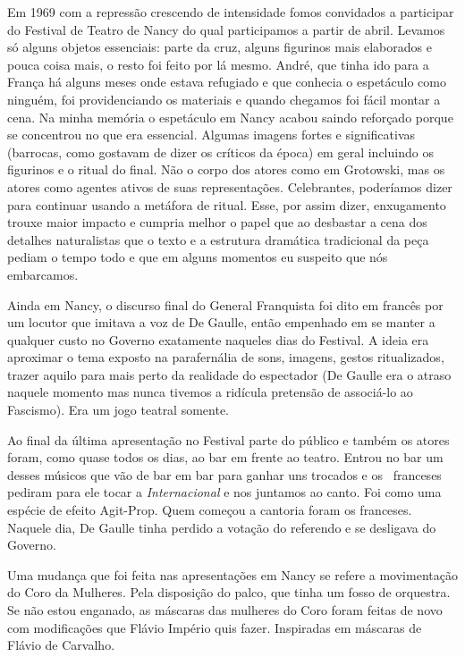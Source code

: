 Em 1969 com a repressão crescendo de intensidade fomos convidados a
participar do Festival de Teatro de Nancy do qual participamos a partir
de abril. Levamos só alguns objetos essenciais: parte da cruz, alguns
figurinos mais elaborados e pouca coisa mais, o resto foi feito por lá
mesmo. André, que tinha ido para a França há alguns meses onde estava
refugiado e que conhecia o espetáculo como ninguém, foi providenciando
os materiais e quando chegamos foi fácil montar a cena. Na minha memória
o espetáculo em Nancy acabou saindo reforçado porque se concentrou no
que era essencial. Algumas imagens fortes e significativas (barrocas,
como gostavam de dizer os críticos da época) em geral incluindo os
figurinos e o ritual do final. Não o corpo dos atores como em Grotowski,
mas os atores como agentes ativos de suas representações. Celebrantes,
poderíamos dizer para continuar usando a metáfora de ritual. Esse, por
assim dizer, enxugamento trouxe maior impacto e cumpria melhor o papel
que ao desbastar a cena dos detalhes naturalistas que o texto e a
estrutura dramática tradicional da peça pediam o tempo todo e que em
alguns momentos eu suspeito que nós embarcamos.

Ainda em Nancy, o discurso final do General Franquista foi dito em
francês por um locutor que imitava a voz de De Gaulle, então empenhado
em se manter a qualquer custo no Governo exatamente naqueles dias do
Festival. A ideia era aproximar o tema exposto na parafernália de sons,
imagens, gestos ritualizados, trazer aquilo para mais perto da realidade
do espectador (De Gaulle era o atraso naquele momento mas nunca tivemos
a ridícula pretensão de associá-lo ao Fascismo). Era um jogo teatral
somente.

Ao final da última apresentação no Festival parte do público e também os
atores foram, como quase todos os dias, ao bar em frente ao teatro.
Entrou no bar um desses músicos que vão de bar em bar para ganhar uns
trocados e os ~franceses pediram para ele tocar a \textit{Internacional} e
nos juntamos ao canto. Foi como uma espécie de efeito Agit-Prop. Quem
começou a cantoria foram os franceses. Naquele dia, De Gaulle tinha
perdido a votação do referendo e se desligava do Governo.

Uma mudança que foi feita nas apresentações em Nancy se refere a
movimentação do Coro da Mulheres. Pela disposição do palco, que tinha um
fosso de orquestra. Se não estou enganado, as máscaras das mulheres do
Coro foram feitas de novo com modificações que Flávio Império quis
fazer. Inspiradas em máscaras de Flávio de Carvalho.

